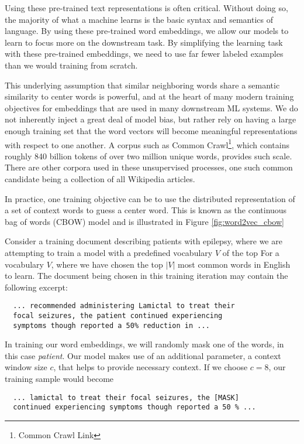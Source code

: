 Using these pre-trained text representations is often critical. Without doing so, the majority of what a machine learns is the basic syntax and semantics of language. By using these pre-trained word embeddings, we allow our models to learn to focus more on the downstream task. By simplifying the learning task with these pre-trained embeddings, we need to use far fewer labeled examples than we would training from scratch.

This underlying assumption that similar neighboring words share a semantic similarity to center words is powerful, and at the heart of many modern training objectives for embeddings that are used in many downstream ML systems.
We do not inherently inject a great deal of model bias, but rather rely on having a large enough training set that the word vectors will become meaningful representations with respect to one another.
A corpus such as Common Crawl\footnote{Common Crawl Link}, which contains roughly 840 billion tokens of over two million unique words, provides such scale.
There are other corpora used in these unsupervised processes, one such common candidate being a collection of all Wikipedia articles.

In practice, one training objective can be to use the distributed representation of a set of context words to guess a center word. This is known as the continuous bag of words (CBOW) model and is illustrated in Figure \ref{fig:word2vec_cbow}

Consider a training document describing patients with epilepsy, where we are attempting to train a model with a predefined vocabulary $V$ of the top For a vocabulary $V$, where we have chosen the top $|V|$ most common words in English to learn.
The document being chosen in this training iteration may contain the following excerpt:

\begin{verbatim}
  ... recommended administering Lamictal to treat their
  focal seizures, the patient continued experiencing
  symptoms though reported a 50% reduction in ...
\end{verbatim}

In training our word embeddings, we will randomly mask one of the words, in this case \textit{patient}.
Our model makes use of an additional parameter, a context window size $c$, that helps to provide necessary context.
If we choose $c = 8$, our training sample would become

\begin{verbatim}
  ... lamictal to treat their focal seizures, the [MASK]
  continued experiencing symptoms though reported a 50 % ...
  \end{verbatim}

